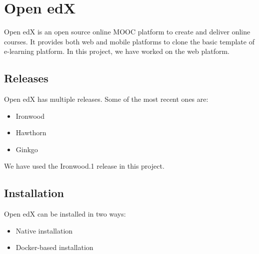 \documentclass[12pt]{article}
\begin{document}
\section{Open edX}
Open edX is an open source online MOOC platform to create and deliver online courses. It provides both web and mobile platforms to clone the basic template of e-learning platform. In this project, we have worked on the web platform.

\subsection{Releases}
Open edX has multiple releases. Some of the most recent ones are:
\begin{itemize}
	\item Ironwood
	\item Hawthorn
	\item Ginkgo
\end{itemize}
We have used the Ironwood.1 release in this project.

\subsection{Installation}
Open edX can be installed in two ways:
\begin{itemize}
	\item Native installation
	\item Docker-based installation
\end{itemize}
\end{document}
